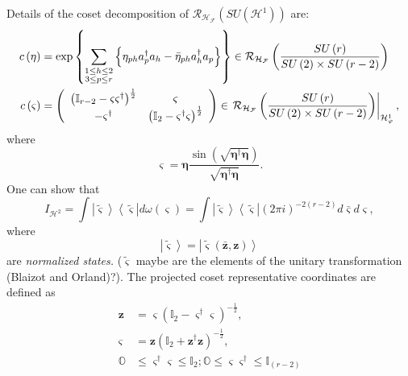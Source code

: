 \documentclass[aps,preprint]{revtex4}%
\begin{document}
Details of the coset decomposition of $\mathcal{R}_{\mathcal{H}_{\mathcal{F}}%
}\left(  SU\left(  \mathcal{H}^{1}\right)  \right)  $ are:
\begin{align}
c\left(  \mathbf{\eta}\right)   &  =\exp\left\{  \sum\limits_{\substack{1\leq
h\leq2\\3\leq p\leq r}}\left\{  \eta_{ph}a_{p}^{\dagger}a_{h}-\bar{\eta}%
_{ph}a_{h}^{\dagger}a_{p}\right\}  \right\}  \in\mathcal{R}_{\mathcal{H}%
_{\mathcal{F}}}\left(  \frac{SU\left(  r\right)  }{SU\left(  2\right)  \times
SU\left(  r-2\right)  }\right) \\
c\left(  \mathbf{\varsigma}\right)   &  =\left(
\begin{array}
[c]{cc}%
\left(  \mathbb{I}_{r-2}-\mathbf{\varsigma\varsigma}^{\dagger}\right)
^{\frac{1}{2}} & \mathbf{\varsigma}\\
-\mathbf{\varsigma}^{\dagger} & \left(  \mathbb{I}_{2}-\mathbf{\varsigma
}^{\dagger}\mathbf{\varsigma}\right)  ^{\frac{1}{2}}%
\end{array}
\right)  \in\left.  \mathcal{R}_{\mathcal{H}_{\mathcal{F}}}\left(
\frac{SU\left(  r\right)  }{SU\left(  2\right)  \times SU\left(  r-2\right)
}\right)  \right\vert _{\mathcal{H}_{\mathbf{\varphi}}^{1}},
\end{align}
where%
\begin{equation}
\mathbf{\varsigma}=\mathbf{\eta}\frac{\sin\left(  \sqrt{\mathbf{\eta}%
^{\dagger}\mathbf{\eta}}\right)  }{\sqrt{\mathbf{\eta}^{\dagger}\mathbf{\eta}%
}}.
\end{equation}
One can show that
\begin{equation}
I_{\mathcal{H}^{2}}=\int\left\vert \mathbf{\tilde{\varsigma}}\right\rangle
\left\langle \mathbf{\tilde{\varsigma}}\right\vert d\omega\left(
\mathbf{\varsigma}\right)  =\int\left\vert \mathbf{\tilde{\varsigma}%
}\right\rangle \left\langle \mathbf{\tilde{\varsigma}}\right\vert \left(  2\pi
i\right)  ^{-2\left(  r-2\right)  }d\mathbf{\bar{\varsigma}}d\mathbf{\varsigma
},
\end{equation}
where
\begin{equation}
\left\vert \mathbf{\tilde{\varsigma}}\right\rangle =\left\vert \mathbf{\tilde
{\varsigma}}\left(  \mathbf{\bar{z},z}\right)  \right\rangle
\end{equation}
are \emph{normalized states. }($\mathbf{\tilde{\varsigma}}$ maybe are the
elements of the unitary transformation (Blaizot and Orland)?). The projected
coset representative coordinates are defined as
\begin{align}
\mathbf{z}  &  =\mathbf{\varsigma}\left(  \mathbb{I}_{2}-\mathbf{\varsigma
}^{\dagger}\mathbf{\varsigma}\right)  ^{-\frac{1}{2}},\nonumber\\
\mathbf{\varsigma}  &  =\mathbf{z}\left(  \mathbb{I}_{2}+\mathbf{z}^{\dagger
}\mathbf{z}\right)  ^{-\frac{1}{2}},\nonumber\\
\mathbb{O}  &  \leq\mathbf{\varsigma}^{\dagger}\mathbf{\varsigma}%
\leq\mathbb{I}_{2};\mathbb{O}\leq\mathbf{\varsigma\mathbf{\varsigma}^{\dagger
}}\leq\mathbb{I}_{\left(  r-2\right)  }%
\end{align}
\end{document}
